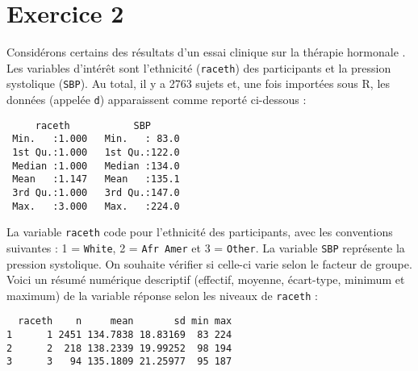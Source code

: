 \documentclass[11pt]{report}
\theoremstyle{definition}
\begin{document}
\section*{Exercice 2}\label{dev3:exo2}
Considérons certains des résultats d'un essai clinique sur la thérapie
hormonale \citep{hulley98}. Les variables d'intérêt sont l'ethnicité
(\texttt{raceth}) des participants et la pression systolique
(\texttt{SBP}). Au total, il y a 2763 sujets et, une fois importées sous R,
les données (appelée \texttt{d}) apparaissent comme reporté ci-dessous :
\begin{verbatim}
     raceth           SBP       
 Min.   :1.000   Min.   : 83.0  
 1st Qu.:1.000   1st Qu.:122.0  
 Median :1.000   Median :134.0  
 Mean   :1.147   Mean   :135.1  
 3rd Qu.:1.000   3rd Qu.:147.0  
 Max.   :3.000   Max.   :224.0  
\end{verbatim}
La variable \texttt{raceth} code pour l'ethnicité des participants, avec les
conventions suivantes : 1 = \texttt{White}, 2 = \texttt{Afr Amer} et 3 =
\texttt{Other}. La variable \texttt{SBP} représente la pression
systolique. On souhaite vérifier si celle-ci varie selon le facteur de
groupe. Voici un résumé numérique descriptif (effectif, moyenne, écart-type,
minimum et maximum) de la variable réponse selon les niveaux de
\texttt{raceth} : 
\begin{verbatim}
  raceth    n     mean       sd min max
1      1 2451 134.7838 18.83169  83 224
2      2  218 138.2339 19.99252  98 194
3      3   94 135.1809 21.25977  95 187
\end{verbatim}
\end{document}
